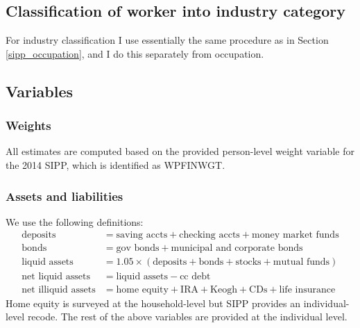 \documentclass{article}
\begin{document}
\subsection{Classification of worker into industry category}
For industry classification I use essentially the same procedure as in Section \ref{sipp_occupation}, and I do this separately from occupation.

\subsection{Variables}

\subsubsection{Weights}
All estimates are computed based on the provided person-level weight variable for the 2014 SIPP, which is identified as WPFINWGT.

\subsubsection{Assets and liabilities}
We use the following definitions:
\begin{align*}
\text{deposits} &= \text{saving accts} + \text{checking accts} + \text{money market funds} \\
\text{bonds} &= \text{gov bonds} + \text{municipal and corporate bonds} \\
\text{liquid assets} &= 1.05 \times (\text{deposits} + \text{bonds} + \text{stocks} + \text{mutual funds}) \\
\text{net liquid assets} &= \text{liquid assets} - \text{cc debt} \\
\text{net illiquid assets} &= \text{home equity} + \text{IRA} + \text{Keogh} + \text{CDs} + \text{life insurance}
\end{align*}
Home equity is surveyed at the household-level but SIPP provides an individual-level recode. The rest of the above variables are provided at the individual level.

\newcommand{\eqindent}{\\ \indent \hspace{4pt} = }
\newcommand{\listassets}[1]{sum(TJS{#1}VAL TJO{#1}VAL TO{#1}VAL)}
\end{document}
